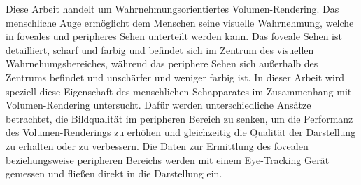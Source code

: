 Diese Arbeit handelt um Wahrnehmungsorientiertes Volumen-Rendering. Das menschliche Auge ermöglicht dem Menschen seine visuelle Wahrnehmung, welche in foveales und peripheres Sehen unterteilt werden kann. Das foveale Sehen ist detailliert, scharf und farbig und befindet sich im Zentrum des visuellen Wahrnehumgsbereiches, während das periphere Sehen sich außerhalb des Zentrums befindet und unschärfer und weniger farbig ist. In dieser Arbeit wird speziell diese Eigenschaft des menschlichen Sehapparates im Zusammenhang mit Volumen-Rendering untersucht. Dafür werden unterschiedliche Ansätze betrachtet, die Bildqualität im peripheren Bereich zu senken, um die Performanz des Volumen-Renderings zu erhöhen und gleichzeitig die Qualität der Darstellung zu erhalten oder zu verbessern. Die Daten zur Ermittlung des fovealen beziehungsweise peripheren Bereichs werden mit einem Eye-Tracking Gerät gemessen und fließen direkt in die Darstellung ein. 